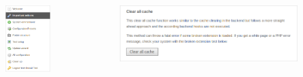 \begin{frame}[fragile]
	\begin{columns}[T]
		\begin{column}{.3\textwidth}
			\begin{figure}\vspace*{-0.4cm}
				\includegraphics[width=0.7\linewidth]{Images/InstallTool/ImportantActions.png}
			\end{figure}
		\end{column}
		\begin{column}{.7\textwidth}
			\begin{figure}\vspace*{-0.4cm}
				\includegraphics[width=0.9\linewidth]{Images/InstallTool/ClearAllCache.png}
			\end{figure}
		\end{column}
	\end{columns}

\end{frame}

